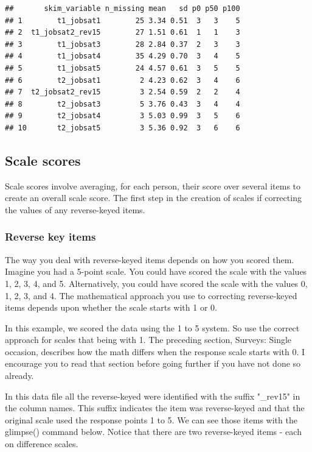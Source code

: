 \documentclass[
]{krantz}
\begin{document}
\begin{verbatim}
##       skim_variable n_missing mean   sd p0 p50 p100
## 1        t1_jobsat1        25 3.34 0.51  3   3    5
## 2  t1_jobsat2_rev15        27 1.51 0.61  1   1    3
## 3        t1_jobsat3        28 2.84 0.37  2   3    3
## 4        t1_jobsat4        35 4.29 0.70  3   4    5
## 5        t1_jobsat5        24 4.57 0.61  3   5    5
## 6        t2_jobsat1         2 4.23 0.62  3   4    6
## 7  t2_jobsat2_rev15         3 2.54 0.59  2   2    4
## 8        t2_jobsat3         5 3.76 0.43  3   4    4
## 9        t2_jobsat4         3 5.03 0.99  3   5    6
## 10       t2_jobsat5         3 5.36 0.92  3   6    6
\end{verbatim}

\hypertarget{scale-scores-1}{%
\subsection{Scale scores}\label{scale-scores-1}}

Scale scores involve averaging, for each person, their score over several items to create an overall scale score. The first step in the creation of scales if correcting the values of any reverse-keyed items.

\hypertarget{reverse-key-items-1}{%
\subsubsection{Reverse key items}\label{reverse-key-items-1}}

The way you deal with reverse-keyed items depends on how you scored them. Imagine you had a 5-point scale. You could have scored the scale with the values 1, 2, 3, 4, and 5. Alternatively, you could have scored the scale with the values 0, 1, 2, 3, and 4. The mathematical approach you use to correcting reverse-keyed items depends upon whether the scale starts with 1 or 0.

In this example, we scored the data using the 1 to 5 system. So use the correct approach for scales that being with 1. The preceding section, Surveys: Single occasion, describes how the math differs when the response scale starts with 0. I encourage you to read that section before going further if you have not done so already.

In this data file all the reverse-keyed were identified with the suffix "\_rev15" in the column names. This suffix indicates the item was reverse-keyed and that the original scale used the response points 1 to 5. We can see those items with the glimpse() command below. Notice that there are two reverse-keyed items - each on difference scales.
\end{document}

